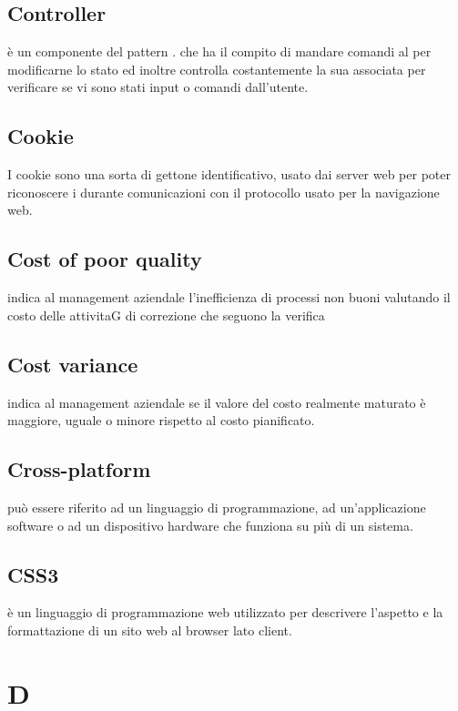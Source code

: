 \documentclass[12pt,a4paper]{article}
\begin{document}
\subsection{Controller} 
 è un componente del pattern . che ha il compito di mandare comandi al  per modificarne lo stato ed inoltre controlla costantemente la sua  associata per verificare se vi sono stati input o comandi dall'utente.

\subsection{Cookie}
I cookie  sono una sorta di gettone identificativo, usato dai server web per poter riconoscere i  durante comunicazioni con il protocollo  usato per la navigazione web.

\subsection{Cost of poor quality}
indica al management aziendale l’inefficienza di processi non buoni valutando il costo delle attivitaG di correzione che seguono la verifica

\subsection{Cost variance} 
 indica al management aziendale se il valore del costo realmente maturato è maggiore, uguale o minore rispetto al costo pianificato.

\subsection{Cross-platform} 
 può essere riferito ad un linguaggio di programmazione, ad un'applicazione software o ad un dispositivo hardware che funziona su più di un sistema.

\subsection{CSS3} 
 è un linguaggio di programmazione web utilizzato per descrivere l'aspetto e la formattazione di un sito web al browser lato client.


\newpage

\section{D}
\end{document}

